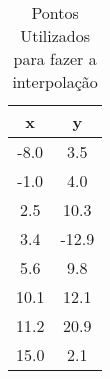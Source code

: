 \begin{center}
    \begin{table}[h]
        \begin{tabular}{|c|c|} \hline
            x & y \\ \hline
            -8.0 & 3.5 \\ \hline
            -1.0 & 4.0 \\ \hline
            2.5 & 10.3 \\ \hline
            3.4 & -12.9 \\ \hline
            5.6 & 9.8 \\ \hline
            10.1 & 12.1 \\ \hline
            11.2 & 20.9 \\ \hline
            15.0 & 2.1 \\ \hline
        \end{tabular}
    \caption{Pontos Utilizados para fazer a interpolação}
    \end{table}
\end{center}




